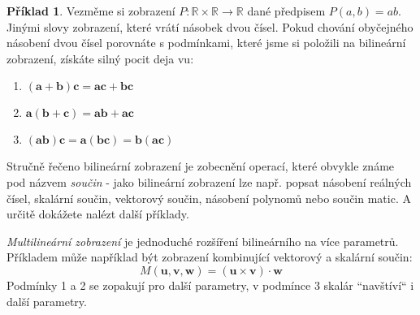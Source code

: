 \documentclass[a5paper,12pt]{amsbook}
\theoremstyle{definition}
\newtheorem{example}{Příklad}[chapter]
\newcommand{\myscalar}[1]{#1}
\newcommand{\myvec}[1]{\mathbf{#1}}
\newcommand{\myspace}[1]{\mathbb{#1}}
\newcommand{\mymap}[1]{#1}
\begin{document}
\begin{example}
Vezměme si zobrazení $\mymap{P}: \myspace{R}\times\myspace{R}\rightarrow\myspace{R}$ dané předpisem
$\mymap{P}(\myscalar{a}, \myscalar{b}) = \myscalar{a}\myscalar{b}$. Jinými slovy zobrazení, které vrátí
násobek dvou čísel. Pokud chování obyčejného násobení dvou čísel porovnáte s podmínkami, které jsme
si položili na bilineární zobrazení, získáte silný pocit deja vu:
\begin{enumerate}
  \item $(\myvec{a} + \myvec{b})\myvec{c} = \myvec{a}\myvec{c} + \myvec{b}\myvec{c}$
  \item $\myvec{a}(\myvec{b} + \myvec{c}) = \myvec{a}\myvec{b} + \myvec{a}\myvec{c}$
  \item $(\myvec{a}\myvec{b})\myvec{c} = \myvec{a}(\myvec{b}\myvec{c}) = \myvec{b}(\myvec{a}\myvec{c})$
\end{enumerate}
\end{example}

\noindent
Stručně řečeno bilineární zobrazení je zobecnění operací, které obvykle známe pod názvem \textit{součin} -
jako bilineární zobrazení lze např. popsat násobení reálných čísel, skalární součin, vektorový součin,
násobení polynomů nebo součin matic. A určitě dokážete nalézt další příklady.

\medskip\noindent
\textit{Multilineární zobrazení} je jednoduché rozšíření bilineárního na více parametrů. Příkladem může
například být zobrazení kombinující vektorový a skalární součin:
\begin{equation*}
\mymap{M}(\myvec{u}, \myvec{v}, \myvec{w}) = (\myvec{u}\times\myvec{v})\cdot\myvec{w}
\end{equation*}
Podmínky 1 a 2 se zopakují pro další parametry, v podmínce 3 skalár ``navštíví`` i další parametry.
\end{document}
